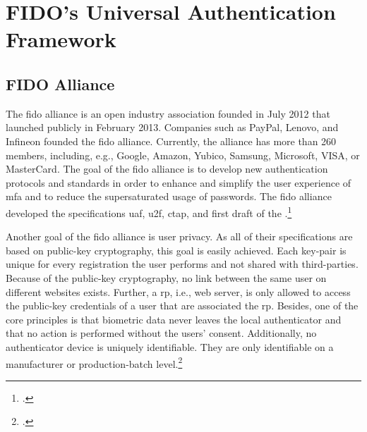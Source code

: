 \section{FIDO's Universal Authentication Framework}
\subsection{FIDO Alliance}
\label{subsec:fido_alliance}

The \gls{fido} alliance is an open industry association founded in July 2012 that launched publicly in February 2013. Companies such as PayPal, Lenovo, and Infineon founded the \gls{fido} alliance. Currently, the alliance has more than 260 members, including, e.g., Google, Amazon, Yubico, Samsung, Microsoft, VISA, or MasterCard. The goal of the \gls{fido} alliance is to develop new authentication protocols and standards in order to enhance and simplify the user experience of \gls{mfa} and to reduce the supersaturated usage of passwords. The \gls{fido} alliance developed the specifications \gls{uaf}, \gls{u2f}, \gls{ctap}, and first draft of the \wa.\footcites[See][]{fido-history}[See][583]{eckert-it-sec-9}[See][17]{fido-ct-2}

Another goal of the \gls{fido} alliance is user privacy. As all of their specifications are based on public-key cryptography, this goal is easily achieved. Each key-pair is unique for every registration the user performs and not shared with third-parties. Because of the public-key cryptography, no link between the same user on different websites exists. Further, a \gls{rp}, i.e., web server, is only allowed to access the public-key credentials of a user that are associated the \gls{rp}. Besides, one of the core principles is that biometric data never leaves the local authenticator and that no action is performed without the users' consent. Additionally, no authenticator device is uniquely identifiable. They are only identifiable on a manufacturer or production-batch level.\footcite[See][6--7]{fido-privacy}


